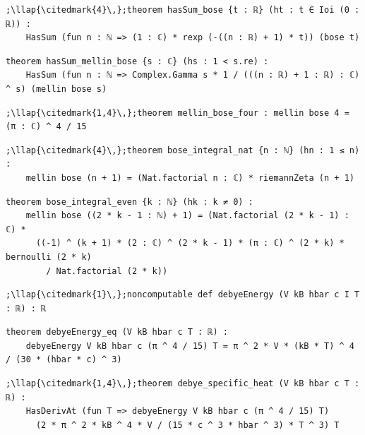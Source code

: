 \begin{lstlisting}[style=leancat]
;\llap{\citedmark{4}\,};theorem hasSum_bose {t : ℝ} (ht : t ∈ Ioi (0 : ℝ)) :
    HasSum (fun n : ℕ => (1 : ℂ) * rexp (-((n : ℝ) + 1) * t)) (bose t)
\end{lstlisting}

\begin{lstlisting}[style=leancat]
theorem hasSum_mellin_bose {s : ℂ} (hs : 1 < s.re) :
    HasSum (fun n : ℕ => Complex.Gamma s * 1 / (((n : ℝ) + 1 : ℝ) : ℂ) ^ s) (mellin bose s)
\end{lstlisting}

\begin{lstlisting}[style=leancat]
;\llap{\citedmark{1,4}\,};theorem mellin_bose_four : mellin bose 4 = (π : ℂ) ^ 4 / 15
\end{lstlisting}

\begin{lstlisting}[style=leancat]
;\llap{\citedmark{4}\,};theorem bose_integral_nat {n : ℕ} (hn : 1 ≤ n) :
    mellin bose (n + 1) = (Nat.factorial n : ℂ) * riemannZeta (n + 1)
\end{lstlisting}

\begin{lstlisting}[style=leancat]
theorem bose_integral_even {k : ℕ} (hk : k ≠ 0) :
    mellin bose ((2 * k - 1 : ℕ) + 1) = (Nat.factorial (2 * k - 1) : ℂ) *
      ((-1) ^ (k + 1) * (2 : ℂ) ^ (2 * k - 1) * (π : ℂ) ^ (2 * k) * bernoulli (2 * k)
        / Nat.factorial (2 * k))
\end{lstlisting}

\begin{lstlisting}[style=leancat]
;\llap{\citedmark{1}\,};noncomputable def debyeEnergy (V kB hbar c I T : ℝ) : ℝ
\end{lstlisting}

\begin{lstlisting}[style=leancat]
theorem debyeEnergy_eq (V kB hbar c T : ℝ) :
    debyeEnergy V kB hbar c (π ^ 4 / 15) T = π ^ 2 * V * (kB * T) ^ 4 / (30 * (hbar * c) ^ 3)
\end{lstlisting}

\begin{lstlisting}[style=leancat]
;\llap{\citedmark{1,4}\,};theorem debye_specific_heat (V kB hbar c T : ℝ) :
    HasDerivAt (fun T => debyeEnergy V kB hbar c (π ^ 4 / 15) T)
      (2 * π ^ 2 * kB ^ 4 * V / (15 * c ^ 3 * hbar ^ 3) * T ^ 3) T
\end{lstlisting}

